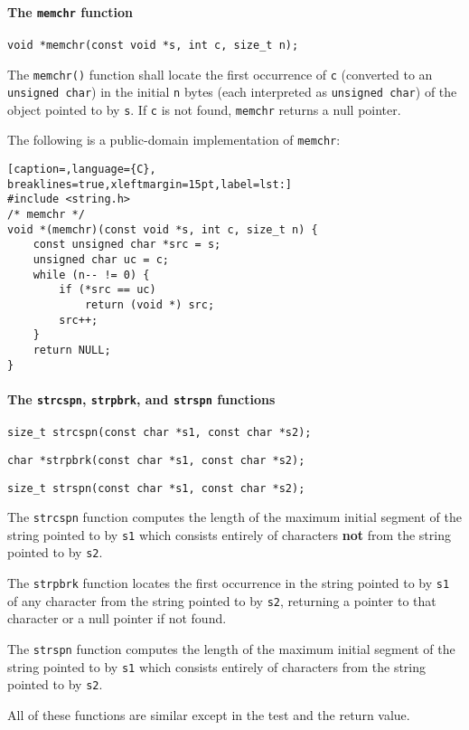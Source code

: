 \paragraph{The \texttt{memchr} function}
\texttt{void *memchr(const void *s, int c, size\_t n);}

The \texttt{memchr()} function shall locate the first occurrence of \texttt{c}
(converted to an \texttt{unsigned char}) in the initial \texttt{n} bytes (each
interpreted as \texttt{unsigned char}) of the object pointed to by \texttt{s}.
If \texttt{c} is not found, \texttt{memchr} returns a null pointer.

The following is a public-domain implementation of \texttt{memchr}:
\lstset{basicstyle=\scriptsize, numbers=left, captionpos=b, tabsize=4}
\begin{lstlisting}[caption=,language={C},
breaklines=true,xleftmargin=15pt,label=lst:]
#include <string.h>
/* memchr */
void *(memchr)(const void *s, int c, size_t n) {
	const unsigned char *src = s;
	unsigned char uc = c;
	while (n-- != 0) {
		if (*src == uc)
			return (void *) src;
		src++;
	}
	return NULL;
}
\end{lstlisting}

\paragraph{The \texttt{strcspn}, \texttt{strpbrk}, and \texttt{strspn} functions}
\texttt{size\_t strcspn(const char *s1, const char *s2);}

\texttt{char *strpbrk(const char *s1, const char *s2);}

\texttt{size\_t strspn(const char *s1, const char *s2);}

The \texttt{strcspn} function computes the length of the maximum initial
segment of the string pointed to by \texttt{s1} which consists entirely of
characters \textbf{not} from the string pointed to by \texttt{s2}.

The \texttt{strpbrk} function locates the first occurrence in the string
pointed to by \texttt{s1} of any character from the string pointed to by
\texttt{s2}, returning a pointer to that character or a null pointer if not
found.

The \texttt{strspn} function computes the length of the maximum initial segment
of the string pointed to by \texttt{s1} which consists entirely of characters
from the string pointed to by \texttt{s2}.

All of these functions are similar except in the test and the return value.

